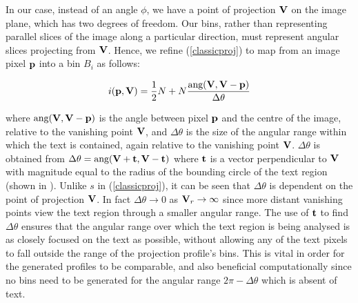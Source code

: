 In our case, instead of an angle $\phi$,
we have a point of projection ${ \bf V }$ on the image plane,
which has two degrees of freedom.
Our bins, rather than representing parallel slices of the image
along a particular direction, must represent angular slices projecting from ${ \bf V }$.
Hence, we refine (\ref{classicproj}) to map from an image pixel ${ \bf p }$
into a bin $B_i$ as follows:

\begin{equation} \label{persproj} i( { \bf p,{ \bf V } } ) = \frac{1}{2} N + N \frac{ \mbox{ang}({ \bf V },{ \bf V }-{ \bf p }) }{ \Delta \theta } \end{equation}

{ \parindent 0mm
where $\mbox{ang}({ \bf V },{ \bf V }-{ \bf p })$ is
the angle between pixel ${ \bf p }$ and the centre of the image,
relative to the vanishing point ${ \bf V }$, and
$\Delta \theta$ is the size of the angular range within which the text
is contained, again relative to the vanishing point ${ \bf V }$. $ \Delta \theta$
is obtained from
$ \Delta \theta = \mbox{ang}({ \bf V }+{ \bf t },{ \bf V }-{ \bf t }) $
%
%
where ${ \bf t }$ is a vector perpendicular to ${ \bf V }$ with
magnitude equal to the
radius of the bounding circle of the text region (shown in ).
Unlike $s$ in (\ref{classicproj}), it can be seen that
$\Delta \theta$ is dependent on the point of projection ${ \bf V }$.
In fact $\Delta \theta \rightarrow 0$ as ${ \bf V }_r \rightarrow \infty$
since more distant vanishing points view the text region through a smaller
angular range.
The use of ${ \bf t }$ to find $\Delta\theta$ ensures that the angular
range over which the text region is being analysed is as closely focused on the text
as possible, without allowing any of the text pixels to fall outside the range of
the projection profile's bins.
This
is vital in order for the generated profiles to be comparable,
and also beneficial computationally since no bins need to be generated
for the angular range $2 {\pi}-\Delta \theta$ which is absent of text.
}

